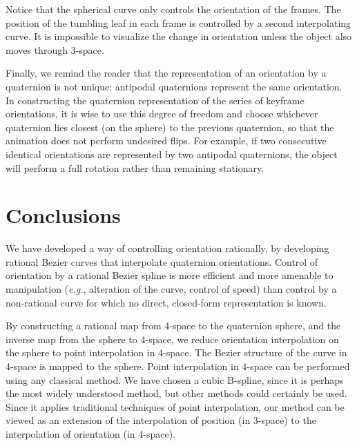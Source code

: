 Notice that the spherical curve only controls the orientation of the frames.
The position of the tumbling leaf in
each frame is controlled by a second interpolating curve.
It is impossible to visualize the change in orientation unless
the object also moves through 3-space.

Finally, we remind the reader that the representation of an orientation
by a quaternion is not unique: antipodal quaternions represent the same
orientation. 
In constructing the quaternion representation of the
series of keyframe orientations, 
it is wise to use this degree of freedom and 
choose whichever quaternion lies closest (on the sphere)
to the previous quaternion, so that the animation does not perform
undesired flips.
For example, if two consecutive identical orientations are 
represented by two antipodal quaternions, 
the object will perform a full rotation rather than remaining stationary.


\section{Conclusions}
\label{sec:finito}

We have developed a way of controlling orientation rationally,
by developing rational Bezier curves that interpolate quaternion orientations.
Control of orientation by a rational Bezier spline is more efficient
and more amenable to manipulation ({\em e.g.}, alteration of the curve, control
of speed) than control by a non-rational curve 
for which no direct, closed-form representation is known.

By constructing a rational map from 4-space to the quaternion sphere,
and the inverse map from the sphere to 4-space,
we reduce orientation interpolation on the sphere 
to point interpolation in 4-space.
The Bezier structure of the curve in 4-space is mapped to the sphere.
Point interpolation in 4-space can be performed using any
classical method.
We have chosen a cubic B-spline,
since it is perhaps the most widely understood method,
but other methods could certainly be used.
Since it applies traditional techniques of point interpolation,
our method can be viewed as an extension of the interpolation of position
(in 3-space) to the interpolation of orientation (in 4-space).


